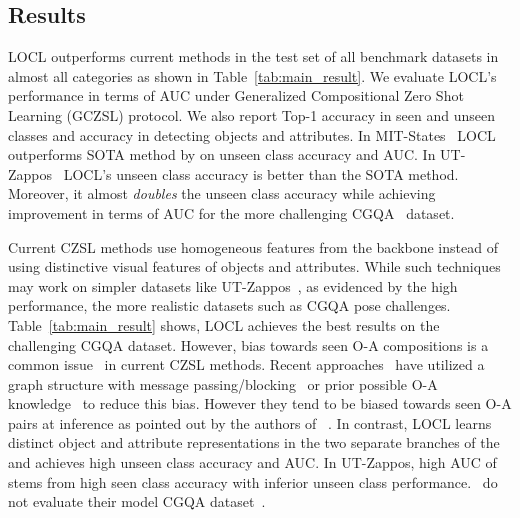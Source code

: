 \documentclass{bmvc2k}
\begin{document}
 \vspace{-0.4cm}



\subsection{Results} \label{section:results}
LOCL outperforms current methods in the test set of all benchmark datasets in almost all categories as shown in Table~\ref{tab:main_result}. We evaluate LOCL's performance in terms of AUC under Generalized Compositional Zero Shot Learning (GCZSL) protocol. 
We also report Top-1 accuracy in seen and unseen classes and accuracy in detecting objects and attributes. 
In MIT-States~\cite{isola2015discovering} LOCL outperforms SOTA method by  on unseen class accuracy and  AUC. 
In UT-Zappos~\cite{yu2017semantic} LOCL's unseen class accuracy is  better than the SOTA method. Moreover, it almost \textit{doubles} the unseen class accuracy while achieving  improvement in terms of AUC for the more challenging CGQA~\cite{naeem2021learning} dataset. 

Current CZSL methods use homogeneous features from the backbone instead of using distinctive visual features of objects and attributes. While such techniques may work on simpler datasets like UT-Zappos~\cite{yu2017semantic}, as evidenced by the high performance, the more realistic datasets such as CGQA pose challenges. 
Table~\ref{tab:main_result} shows, LOCL achieves the best results on the challenging CGQA dataset. 
However, bias towards seen O-A compositions is a common issue~\cite{purushwalkam2019task} in current CZSL methods. Recent approaches~\cite{xu2021relation, naeem2021learning} have utilized a graph structure with message passing/blocking~\cite{xu2021relation} or prior possible O-A knowledge~\cite{naeem2021learning} to reduce this bias. 
However they tend to be biased towards seen O-A pairs at inference as pointed out by the authors of ~\cite{xu2021relation}.
In contrast, LOCL learns distinct object and attribute representations in the two separate branches of the  and achieves high unseen class accuracy and AUC.
In UT-Zappos, high AUC of~\cite{xu2021relation} stems from high seen class accuracy with inferior unseen class performance.~\cite{xu2021relation} do not evaluate their model CGQA dataset~\cite{naeem2021learning}.
\end{document}

